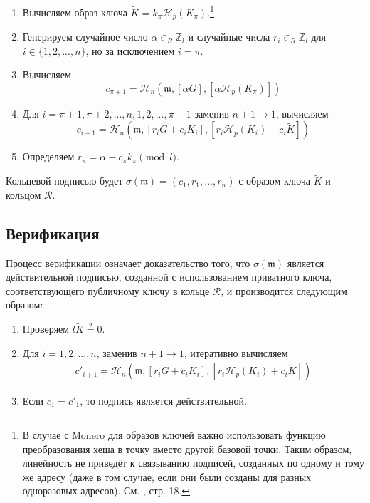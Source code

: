 \begin{enumerate}
	\item Вычисляем образ ключа \(\tilde{K} = k_\pi \mathcal{H}_p(K_\pi)\).\footnote{В случае с Monero для образов ключей важно использовать функцию преобразования хеша в точку вместо другой базовой точки. Таким образом, линейность не приведёт к связыванию подписей, созданных по одному и тому же адресу (даже в том случае, если они были созданы для разных одноразовых адресов). См. \cite{cryptoNoteWhitePaper}, стр. 18.}

	\item Генерируем случайное число \(\alpha \in_R \mathbb{Z}_l\) и случайные числа \(r_i \in_R \mathbb{Z}_l\) для \(i \in \{1, 2, ..., n\}\), но за исключением \(i = \pi\).

	\item Вычисляем
	\[c_{\pi+1} = \mathcal{H}_n(\mathfrak{m}, [\alpha G], [\alpha \mathcal{H}_p(K_\pi)])\]

	\item Для \(i = \pi+1, \pi+2, ..., n, 1, 2, ..., \pi-1\) заменив \(n + 1 \rightarrow 1\), вычисляем\vspace{.175cm}
	\[c_{i+1} = \mathcal{H}_n(\mathfrak{m}, [r_i G + c_i K_i], [r_i \mathcal{H}_p(K_i) + c_i \tilde{K}])\]

	\item Определяем \(r_\pi = \alpha - c_\pi k_\pi \pmod l\).
\end{enumerate}

Кольцевой подписью будет \(\sigma(\mathfrak{m}) = (c_1, r_1, ..., r_n)\) с образом ключа $\tilde{K}$ и кольцом $\mathcal{R}$.


\subsection*{Верификация}

Процесс верификации означает доказательство того, что $\sigma(\mathfrak{m})$ является действительной под\-писью, созданной с использованием приватного ключа, соответствующего публичному ключу в кольце $\mathcal{R}$, и производится следующим образом:

\begin{enumerate}
    \item Проверяем $l \tilde{K} \stackrel{?}{=} 0$.
	\item Для \(i = 1, 2, ..., n\), заменив \(n + 1 \rightarrow 1\), итеративно вычисляем\vspace{.175cm}
	\begin{align*}
	c'_{i+1} = \mathcal{H}_n(\mathfrak{m}, [r_i G + c_i {K_i}], [r_i \mathcal{H}_p(K_i) + c_i \tilde{K}])
	\end{align*}

	\item Если \(c_1 = c'_1\), то подпись является действительной.
\end{enumerate}

